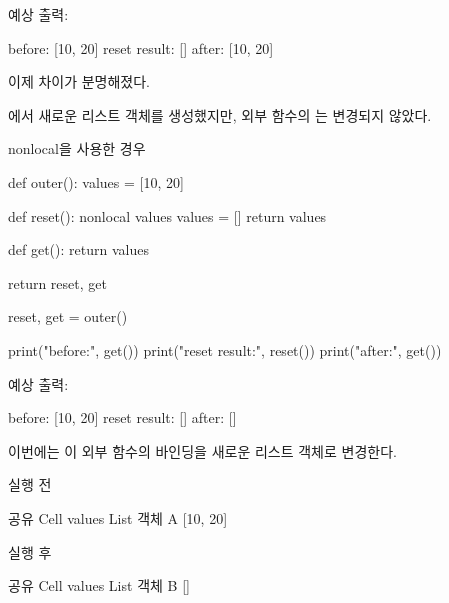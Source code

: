 예상 출력:

\begin{dhkzsh}
before: [10, 20]
reset result: []
after: [10, 20]
\end{dhkzsh}

이제 차이가 분명해졌다.

에서 새로운 리스트 객체를 생성했지만, 외부 함수의 는 변경되지 않았다.

\begin{dhknote}
\begin{dhksmry}[centered]
nonlocal을 사용한 경우
\end{dhksmry}
\end{dhknote}

\begin{dhkcode}
def outer():
    values = [10, 20]

    def reset():
        nonlocal values
        values = []
        return values

    def get():
        return values

    return reset, get


reset, get = outer()

print("before:", get())
print("reset result:", reset())
print("after:", get())
\end{dhkcode}

예상 출력:

\begin{dhkzsh}
before: [10, 20]
reset result: []
after: []
\end{dhkzsh}

이번에는 이 외부 함수의  바인딩을 새로운 리스트 객체로 변경한다.

\begin{dhknote}
\begin{dhksmry}[centered]
실행 전
\end{dhksmry}
\end{dhknote}

\begin{dhksmry}[centered]
공유 Cell values
\da
List 객체 A
[10, 20]
\end{dhksmry}

\begin{dhknote}
\begin{dhksmry}[centered]
실행 후
\end{dhksmry}
\end{dhknote}

\begin{dhksmry}[centered]
공유 Cell values
\da
List 객체 B
[]
\end{dhksmry}

